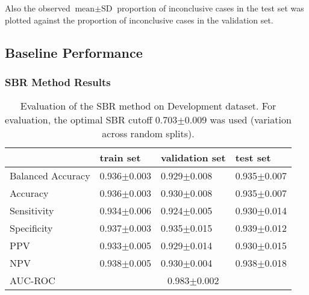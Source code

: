 Also the observed $\text{mean} \pm \text{SD}$ proportion of inconclusive cases in the test set was plotted 
against the proportion of inconclusive cases in the validation set.



\subsection{Baseline Performance}
\label{subsec:baseline_performance}

\subsubsection{SBR Method Results}
\label{subsubsec:eval_sbr}




\begin{table}[ht]
  \caption{Evaluation of the SBR method on Development dataset. 
  For evaluation, the optimal SBR cutoff 0.703$\pm$0.009 was used (variation across random splits).}
  \centering
  \begin{tabular}{llll}
      \hline
                        & train set         & validation set      & test set             \\
      \hline
      Balanced Accuracy & 0.936$\pm$0.003   &   0.929$\pm$0.008   &  0.935$\pm$0.007     \\
      Accuracy          & 0.936$\pm$0.003   &   0.930$\pm$0.008   &  0.935$\pm$0.007     \\
      Sensitivity       &  0.934$\pm$0.006  &   0.924$\pm$0.005   &  0.930$\pm$0.014     \\
      Specificity       & 0.937$\pm$0.003   &   0.935$\pm$0.015   &  0.939$\pm$0.012     \\
      PPV               &  0.933$\pm$0.005  &   0.929$\pm$0.014   &  0.930$\pm$0.015     \\
      NPV               &  0.938$\pm$0.005  &   0.930$\pm$0.004   &  0.938$\pm$0.018     \\
      \hline
      AUC-ROC          &  \multicolumn{3}{c}{0.983$\pm$0.002 }  \\
      \hline
  \end{tabular}
 \label{t1:sbr_perf_eval_table}
\end{table}


